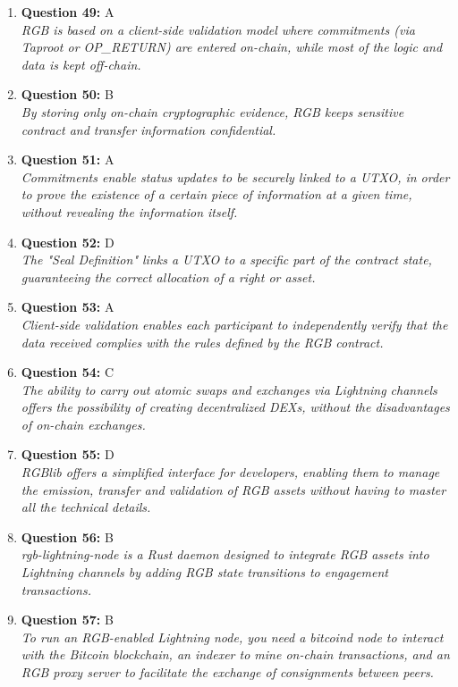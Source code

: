 \documentclass[12pt,a4paper]{article}
\begin{document}
\begin{enumerate}
\item \textbf{Question 49:} A
\\ \textit{RGB is based on a client-side validation model where commitments (via Taproot or OP\_RETURN) are entered on-chain, while most of the logic and data is kept off-chain.}

\item \textbf{Question 50:} B
\\ \textit{By storing only on-chain cryptographic evidence, RGB keeps sensitive contract and transfer information confidential.}

\item \textbf{Question 51:} A
\\ \textit{Commitments enable status updates to be securely linked to a UTXO, in order to prove the existence of a certain piece of information at a given time, without revealing the information itself.}

\item \textbf{Question 52:} D
\\ \textit{The "Seal Definition" links a UTXO to a specific part of the contract state, guaranteeing the correct allocation of a right or asset.}

\item \textbf{Question 53:} A
\\ \textit{Client-side validation enables each participant to independently verify that the data received complies with the rules defined by the RGB contract.}

\item \textbf{Question 54:} C
\\ \textit{The ability to carry out atomic swaps and exchanges via Lightning channels offers the possibility of creating decentralized DEXs, without the disadvantages of on-chain exchanges.}

\item \textbf{Question 55:} D
\\ \textit{RGBlib offers a simplified interface for developers, enabling them to manage the emission, transfer and validation of RGB assets without having to master all the technical details.}

\item \textbf{Question 56:} B
\\ \textit{rgb-lightning-node is a Rust daemon designed to integrate RGB assets into Lightning channels by adding RGB state transitions to engagement transactions.}

\item \textbf{Question 57:} B
\\ \textit{To run an RGB-enabled Lightning node, you need a bitcoind node to interact with the Bitcoin blockchain, an indexer to mine on-chain transactions, and an RGB proxy server to facilitate the exchange of consignments between peers.}


\end{enumerate}
\end{document}
